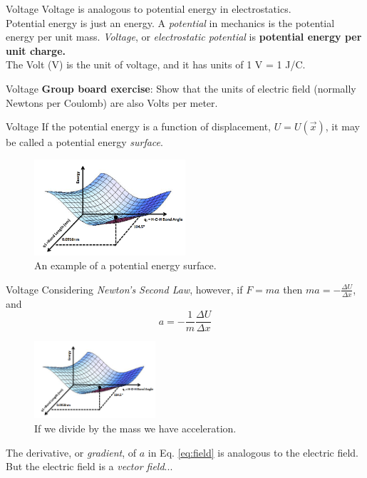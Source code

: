 \documentclass{beamer}
\begin{document}
\begin{frame}{Voltage}
\alert{Voltage} is analogous to potential energy in electrostatics. \\ \vspace{1cm}
Potential energy is just an energy.  A \textit{potential} in mechanics is the potential energy per unit mass.  \textit{Voltage}, or \textit{electrostatic potential} is \textbf{\alert{potential energy per unit charge.}} \\ \vspace{0.5cm}
The Volt (V) is the unit of voltage, and it has units of 1 V = 1 J/C.
\end{frame}

\begin{frame}{Voltage}
\textbf{Group board exercise}: Show that the units of electric field (normally Newtons per Coulomb) are also Volts per meter.
\end{frame}

\begin{frame}{Voltage}
\small
If the potential energy is a function of displacement, $U = U(\vec{x})$, it may be called a potential energy \textit{surface}.
\begin{figure}
\centering
\includegraphics[width=0.5\textwidth]{figures/potential.png}
\caption{\label{fig:potential} An example of a potential energy surface.}
\end{figure}
\end{frame}

\begin{frame}{Voltage}
\small
Considering \textit{Newton's Second Law}, however, if $F = m a$ then $m a = -\frac{\Delta U}{\Delta x}$, and
\begin{equation}
a = -\frac{1}{m}\frac{\Delta U}{\Delta x} \label{eq:field}
\end{equation}
\begin{figure}
\centering
\includegraphics[width=0.4\textwidth]{figures/potential.png}
\caption{\label{fig:potential2} If we divide by the mass we have acceleration.}
\end{figure}
The derivative, or \textit{gradient}, of $a$ in Eq. \ref{eq:field} is analogous to the electric field.  But the electric field is a \textit{vector field}...
\end{frame}
\end{document}
